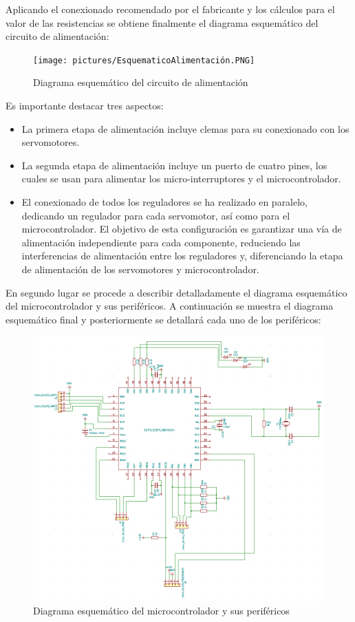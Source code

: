 Aplicando el conexionado recomendado por el fabricante y los cálculos para el valor de las resistencias se obtiene finalmente el diagrama esquemático del circuito de alimentación:

\begin{figure}[H]
    \centering 
    \texttt{[image: pictures/EsquematicoAlimentación.PNG]}
    \caption{Diagrama esquemático del circuito de alimentación}
    \label{fig:kdiagram}
\end{figure}


Es importante destacar tres aspectos:
\begin{itemize}
    \item La primera etapa de alimentación incluye clemas para su conexionado con los servomotores.
    \item La segunda etapa de alimentación incluye un puerto de cuatro pines, los cuales se usan para alimentar los micro-interruptores y el microcontrolador.
    \item El conexionado de todos los reguladores se ha realizado en paralelo, dedicando un regulador para cada servomotor, así como para el microcontrolador. El objetivo de esta configuración es garantizar una vía de alimentación independiente para cada componente, reduciendo las interferencias de alimentación entre los reguladores y, diferenciando la etapa de alimentación de los servomotores y microcontrolador.
\end{itemize}

En segundo lugar se procede a describir detalladamente el diagrama esquemático del microcontrolador y sus periféricos. A continuación se muestra el diagrama esquemático final y posteriormente se detallará cada uno de los periféricos:

\begin{figure}[H]
    \centering 
    \includegraphics[width=.95\linewidth]{pictures/EsquematicoMicrocontrolador.PNG}
    \caption{Diagrama esquemático del microcontrolador y sus periféricos}
    \label{fig:kdiagram}
\end{figure}

